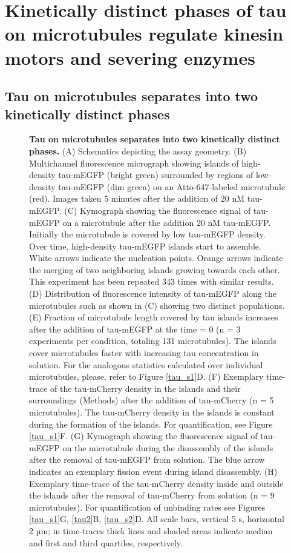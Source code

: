 \section{Kinetically distinct phases of tau on microtubules regulate kinesin motors and severing enzymes}
\subsection{Tau on microtubules separates into two kinetically distinct phases}
\begin{figure}[h!tb]
\centering
\caption[Tau on microtubules separates into two kinetically distinct phases.]{
\textbf{Tau on microtubules separates into two kinetically distinct phases.} (A) Schematics depicting the assay geometry. (B) Multichannel fluorescence micrograph showing islands of high-density tau-mEGFP (bright green) surrounded by regions of low-density tau-mEGFP (dim green) on an Atto-647-labeled microtubule (red). Images taken 5 minutes after the addition of 20 nM tau-mEGFP. (C) Kymograph showing the fluorescence signal of tau-mEGFP on a microtubule after the addition 20 nM tau-mEGFP. Initially the microtubule is covered by low tau-mEGFP density. Over time, high-density tau-mEGFP islands start to assemble. White arrows indicate the nucleation points. Orange arrows indicate the merging of two neighboring islands growing towards each other. This experiment has been repeated 343 times with similar results. (D) Distribution of fluorescence intensity of tau-mEGFP along the microtubules such as shown in (C) showing two distinct populations. (E) Fraction of microtubule length covered by tau islands increases after the addition of tau-mEGFP at the time = 0 (n = 3 experiments per condition, totaling 131 microtubules). The islands cover microtubules faster with increasing tau concentration in solution. For the analogous statistics calculated over individual microtubules, please, refer to Figure \ref{tau_s1}D. (F) Exemplary time-trace of the tau-mCherry density in the islands and their surroundings (Methods) after the addition of tau-mCherry (n = 5 microtubules). The tau-mCherry density in the islands is constant during the formation of the islands. For quantification, see Figure \ref{tau_s1}F. (G) Kymograph showing the fluorescence signal of tau-mEGFP on the microtubule during the disassembly of the islands after the removal of tau-mEGFP from solution. The blue arrow indicates an exemplary fission event during island disassembly. (H) Exemplary time-trace of the tau-mCherry density inside and outside the islands after the removal of tau-mCherry from solution (n = 9 microtubules). For quantification of unbinding rates see Figures \ref{tau_s1}G, \ref{tau2}B, \ref{tau_s2}D. All scale bars, vertical 5 s, horizontal 2 µm; in time-traces thick lines and shaded areas indicate median and first and third quartiles, respectively. 
	}\label{tau1}
\end{figure}
